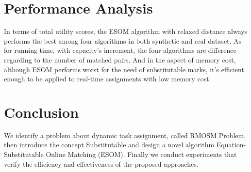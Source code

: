 \documentclass[color,twoside,amssymb,twocolumn]{article}
\begin{document}
\section{Performance Analysis}

In terms of total utility scores, the ESOM algorithm with relaxed distance always performs the best among four algorithms in both synthetic and real dataset. As for running time, with capacity's increment, the four algorithms are difference regarding to the number of matched pairs. And in the aspect of memory cost, although ESOM performs worst for the need of substitutable marks, it's efficient enough to be applied to real-time assignments with low memory cost.

\section{Conclusion}

We identify a problem about dynamic task assignment, called RMOSM Problem, then introduce the concept Substitutable and design a novel algorithm Equation-Substitutable Online Matching (ESOM). Finally we conduct experiments that verify the efficiency and effectiveness of the proposed approaches.



\end{document}
